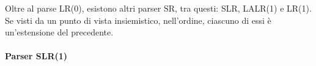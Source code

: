 \documentclass{subfiles}
\begin{document}
Oltre al parse LR(0), esistono altri parser SR, tra questi: SLR, LALR(1) e LR(1).
Se visti da un punto di vista insiemistico, nell'ordine, ciascuno di essi è un'estensione del precedente.

\paragraph{Parser SLR(1)}

\end{document}
